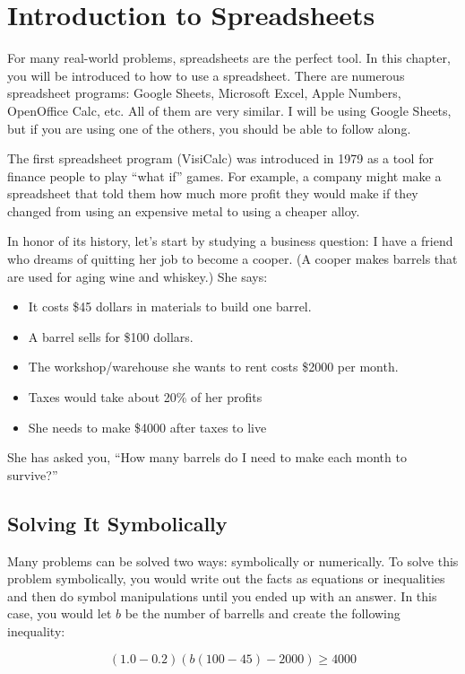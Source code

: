 \chapter{Introduction to Spreadsheets}

For many real-world problems, spreadsheets are the perfect
tool. In this chapter, you will be introduced to how to use a
spreadsheet. There are numerous spreadsheet programs: Google Sheets,
Microsoft Excel, Apple Numbers, OpenOffice Calc, etc.  All of them are
very similar. I will be using Google Sheets, but if you are using one
of the others, you should be able to follow along.

The first spreadsheet program (VisiCalc) was introduced in 1979 as a
tool for finance people to play ``what if'' games.  For example, a
company might make a spreadsheet that told them how much more profit
they would make if they changed from using an expensive metal to using
a cheaper alloy.

In honor of its history, let's start by studying a business question:
I have a friend who dreams of quitting her job to become a cooper. (A
cooper makes barrels that are used for aging wine and whiskey.)  She
says:
\begin{itemize}
\item It costs \$45 dollars in materials to build one barrel.
\item A barrel sells for \$100 dollars.
\item The workshop/warehouse she wants to rent costs \$2000 per month.
\item Taxes would take about 20\% of her profits
\item She needs to make \$4000 after taxes to live 
\end{itemize}

She has asked you, ``How many barrels do I need to make each month to survive?''

\section{Solving It Symbolically}

Many problems can be solved two ways: symbolically or numerically. To
solve this problem symbolically, you would write out the facts as
equations or inequalities and then do symbol manipulations until you
ended up with an answer. In this case, you would let $b$ be the number
of barrells and create the following inequality:

$$(1.0 - 0.2)\left(b(100 - 45) - 2000\right) \geq 4000$$

